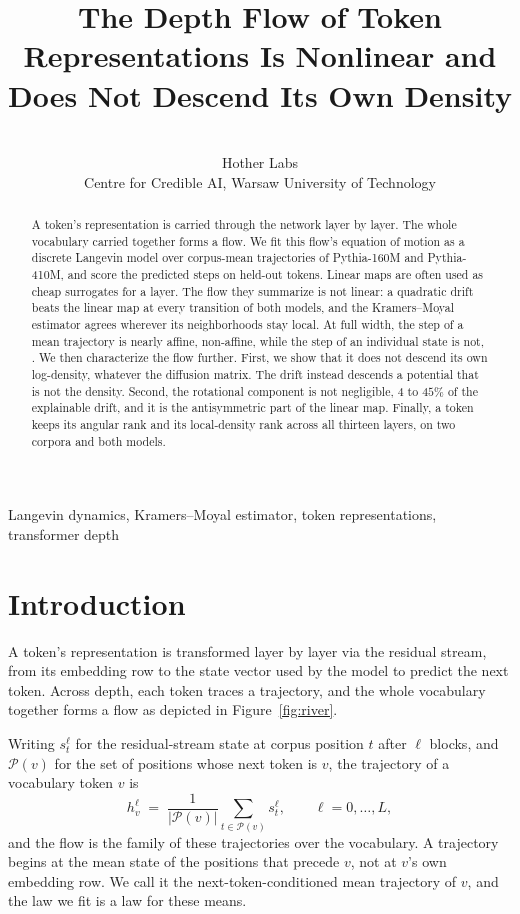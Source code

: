 \documentclass[mlmain]{jmlr}
\title[The Depth Flow of Token Representations]{The Depth Flow of Token
Representations Is Nonlinear and Does Not Descend Its Own Density}
\author{\Name{Alexandre Quemy} \Email{alexandre@hother.io}\\
 \addr Hother Labs\\
 Centre for Credible AI, Warsaw University of Technology}
\begin{document}
\maketitle

\begin{abstract}
A token's representation is carried through the network layer by
layer. The whole vocabulary carried together forms a flow. We fit this
flow's equation of motion as a discrete Langevin model over
corpus-mean trajectories of Pythia-160M and Pythia-410M, and score the
predicted steps on held-out tokens. 
Linear maps are often used as cheap surrogates for a layer. The flow
they summarize is not linear: a quadratic drift beats the
linear map at every transition of both models, and the
Kramers--Moyal estimator agrees wherever its neighborhoods stay local.
At full width, the step of a mean trajectory is nearly affine,
\crFwShareMedRound{} non-affine, while the step of an individual state
is not, \crOccFwShareMed{}.
 We then characterize the flow further.
First, we show that it does not descend its own log-density,
whatever the diffusion matrix.
The drift instead descends a potential that is not the
density. Second, the rotational component is not negligible, $4$ to
$45\%$ of the explainable drift, and it is the antisymmetric part
of the linear map. Finally, a token keeps its angular rank and its
local-density rank across all thirteen layers, on two corpora and both
models.
\end{abstract}
\begin{keywords}
Langevin dynamics, Kramers--Moyal estimator, token representations,
transformer depth
\end{keywords}

\section{Introduction}
\label{sec:intro}
A token's representation is transformed layer by layer via the residual stream, from its embedding row to the state 
vector used by the model to predict the next token.
Across depth, each token traces a trajectory, and the whole vocabulary together forms a flow as depicted in Figure~\ref{fig:river}.

Writing $s^{\ell}_{t}$ for the residual-stream state at corpus
position $t$ after $\ell$ blocks, and $\mathcal{P}(v)$ for the set of
positions whose next token is $v$, the trajectory of a vocabulary token
$v$ is
\[
  h^{\ell}_{v} \;=\; \frac{1}{|\mathcal{P}(v)|}
  \sum_{t \in \mathcal{P}(v)} s^{\ell}_{t},
  \qquad \ell = 0, \dots, L ,
\]
and the flow is the family of these trajectories over the vocabulary.
A trajectory begins at the mean state of the positions that precede
$v$, not at $v$'s own embedding row. We call it the next-token-conditioned mean trajectory of $v$, and the law we fit is a law for these means.
\end{document}
